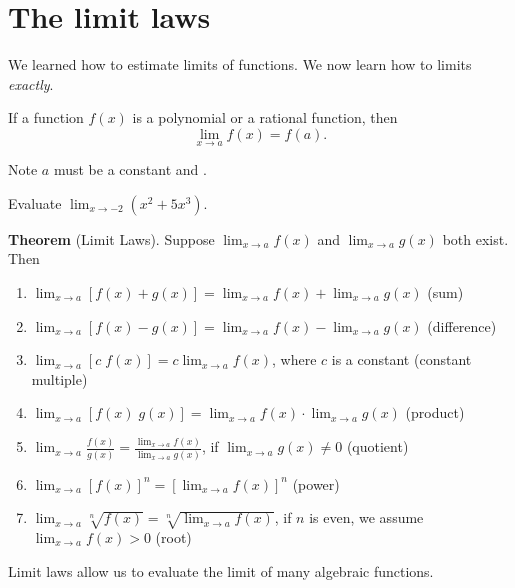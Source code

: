 \documentclass[../main.tex]{subfiles}
\begin{document}
 \section{The limit laws}
  We learned how to estimate limits of functions. We now learn how to  limits \emph{exactly}.


  \begin{mdframed}[style=simple-compact]
    If a function \(f(x)\) is a polynomial or a rational function, then
    \[
      \lim_{x \to a} f(x) = f(a).
    \]
  \end{mdframed}
  \faExclamationTriangle{} Note \(a\) must be a constant \underline{\hspace{6cm}} and \underline{\hspace{2in}}.

  \begin{example}
    Evaluate \(\lim_{x \to -2} (x^{2} + 5 x^{3})\).

  \end{example}

  \begin{mdframed}[style=withref-compact]
    \textbf{Theorem} (Limit Laws). Suppose \(\lim_{x \to a} f(x)\) and \(\lim_{x \to a} g(x)\) {both exist}. Then
    \begin{enumerate}[label=(\arabic*)]
      \item \(\lim_{x \to a} [f(x) + g(x)] = \lim_{x \to a} f(x) + \lim_{x \to a} g(x)\) \hfill (sum)
      \item \(\lim_{x \to a} [f(x) - g(x)] = \lim_{x \to a} f(x) - \lim_{x \to a} g(x)\) \hfill (difference)
      \item \(\lim_{x \to a} [c \; f(x)] = c \lim_{x \to a} f(x)\), where \(c\) is a constant \hfill (constant multiple)
      \item \(\lim_{x \to a} [f(x) \; g(x)] = \lim_{x \to a} f(x) \cdot \lim_{x \to a} g(x)\) \hfill (product)
      \item \(\lim_{x \to a} \frac{f(x)}{g(x)} = \frac{\lim_{x \to a} f(x)}{\lim_{x \to a} g(x)}\), \quad if {\(\lim_{x \to a}g(x) \ne 0\)} \hfill (quotient)
      \item \(\lim_{x \to a} [f(x)]^{n} = \left[ \lim_{x \to a} f(x) \right]^{n}\) \hfill (power)
      \item \(\lim_{x \to a} \sqrt[n]{f(x)} = \sqrt[n]{\lim_{x \to a} f(x)}\), \quad if \(n\) is even, we assume {\(\lim_{x \to a} f(x) > 0\)} \hfill (root)
    \end{enumerate}
  \end{mdframed}
  \faLightbulb{} Limit laws allow us to evaluate the limit of many algebraic functions. 
\end{document}
